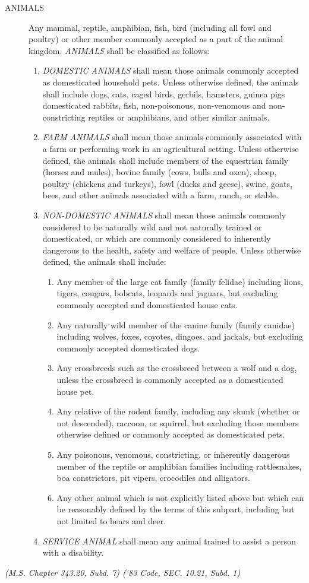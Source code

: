 \documentclass[code.tex]{subfiles}
\begin{document}
\begin{description}
\item[ANIMALS] Any mammal, reptile, amphibian, fish, bird (including all fowl and poultry) or other member commonly accepted as a part of the animal kingdom.  \emph{ANIMALS} shall be classified as follows:
\begin{enumerate}[{\indent}1)]
\item \emph{DOMESTIC ANIMALS} shall mean those animals commonly accepted as domesticated household pets.  Unless otherwise defined, the animals shall include dogs, cats, caged birds, gerbils, hamsters, guinea pigs domesticated rabbits, fish, non-poisonous, non-venomous and non-constricting reptiles or amphibians, and other similar animals.
\item \emph{FARM ANIMALS} shall mean those animals commonly associated with a farm or performing work in an agricultural setting.  Unless otherwise defined, the animals shall include members of the equestrian family (horses and mules), bovine family (cows, bulls and oxen), sheep, poultry (chickens and turkeys), fowl (ducks and geese), swine, goats, bees, and other animals associated with a farm, ranch, or stable.
\item \emph{NON-DOMESTIC ANIMALS} shall mean those animals commonly considered to be naturally wild and not naturally trained or domesticated, or which are commonly considered to inherently dangerous to the health, safety and welfare of people.  Unless otherwise defined, the animals shall include:
\begin{enumerate}
\item Any member of the large cat family (family felidae) including lions, tigers, cougars, bobcats, leopards and jaguars, but excluding commonly accepted and domesticated house cats.
\item Any naturally wild member of the canine family (family canidae) including wolves, foxes, coyotes, dingoes, and jackals, but excluding commonly accepted domesticated dogs.
\item Any crossbreeds such as the crossbreed between a wolf and a dog, unless the crossbreed is commonly accepted as a domesticated house pet.
\item Any relative of the rodent family, including any skunk (whether or not descended), raccoon, or squirrel, but excluding those members otherwise defined or commonly accepted as domesticated pets.
\item Any poisonous, venomous, constricting, or inherently dangerous member of the reptile or amphibian families including rattlesnakes, boa constrictors, pit vipers, crocodiles and alligators.
\item Any other animal which is not explicitly listed above but which can be reasonably defined by the terms of this subpart, including but not limited to bears and deer.
\end{enumerate}
\item \emph{SERVICE ANIMAL} shall mean any animal trained to assist a person with a disability.
\end{enumerate}
\end{description}
\emph{(M.S. Chapter 343.20, Subd. 7)  (‘83 Code, SEC. 10.21, Subd. 1)}
\end{document}
